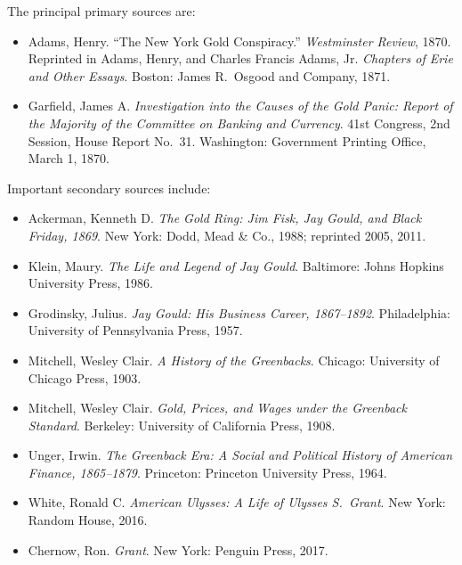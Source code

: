 \documentclass[12pt]{article}
\begin{document}
\noindent The principal primary sources are:

\begin{itemize}
    \item Adams, Henry. ``The New York Gold Conspiracy.'' 
    \emph{Westminster Review}, 1870. Reprinted in Adams, Henry, and 
    Charles Francis Adams, Jr. \emph{Chapters of Erie and Other 
    Essays}. Boston: James R.\ Osgood and Company, 1871.
    
    \item Garfield, James A. \emph{Investigation into the Causes of the 
    Gold Panic: Report of the Majority of the Committee on Banking and 
    Currency}. 41st Congress, 2nd Session, House Report No.\ 31. 
    Washington: Government Printing Office, March 1, 1870.
\end{itemize}

\noindent Important secondary sources include:

\begin{itemize}
    \item Ackerman, Kenneth D. \emph{The Gold Ring: Jim Fisk, Jay Gould, 
    and Black Friday, 1869}. New York: Dodd, Mead \& Co., 1988; 
    reprinted 2005, 2011.
    
    \item Klein, Maury. \emph{The Life and Legend of Jay Gould}. 
    Baltimore: Johns Hopkins University Press, 1986.
    
    \item Grodinsky, Julius. \emph{Jay Gould: His Business Career, 
    1867--1892}. Philadelphia: University of Pennsylvania Press, 1957.
    
    \item Mitchell, Wesley Clair. \emph{A History of the Greenbacks}. 
    Chicago: University of Chicago Press, 1903.
    
    \item Mitchell, Wesley Clair. \emph{Gold, Prices, and Wages under 
    the Greenback Standard}. Berkeley: University of California Press, 
    1908.
    
    \item Unger, Irwin. \emph{The Greenback Era: A Social and Political 
    History of American Finance, 1865--1879}. Princeton: Princeton 
    University Press, 1964.
    
    \item White, Ronald C. \emph{American Ulysses: A Life of Ulysses 
    S.\ Grant}. New York: Random House, 2016.
    
    \item Chernow, Ron. \emph{Grant}. New York: Penguin Press, 2017.
\end{itemize}
\end{document}
